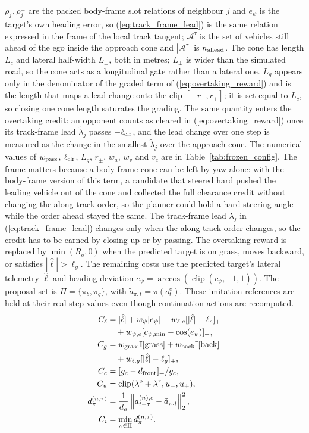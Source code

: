 \documentclass[journal]{IEEEtran}
\begin{document}
$\rho_j^{\parallel},\rho_j^{\perp}$ are the packed body-frame slot relations
of neighbour $j$ and $e_\psi$ is the target's own heading error, so
(\ref{eq:track_frame_lead}) is the same relation expressed in the frame of the
local track tangent; $\mathcal A^\tau$ is the set of vehicles still ahead of the
ego inside the approach cone and $|\mathcal A^\tau|$ is $n_{\rm ahead}$.
The cone has length $L_c$ and lateral half-width $L_\perp$, both in metres;
$L_\perp$ is wider than the simulated road, so the cone acts as a longitudinal
gate rather than a lateral one. $L_g$ appears only in the denominator of the
graded term of (\ref{eq:overtaking_reward}) and is the length that maps a lead
change onto the clip $[-r_-,r_+]$; it is set equal to $L_c$, so closing one cone
length saturates the grading.
The same quantity enters the overtaking credit: an opponent counts as cleared
in (\ref{eq:overtaking_reward}) once its track-frame lead $\tilde\lambda_j$
passes $-\ell_{\rm clr}$, and the lead change over one step is measured as the
change in the smallest $\tilde\lambda_j$ over the approach cone. The numerical
values of $w_{\rm pass}$, $\ell_{\rm clr}$, $L_g$, $r_\pm$, $w_a$, $w_v$ and
$v_c$ are in Table~\ref{tab:frozen_config}.
The frame matters because a body-frame cone can be left by yaw alone: with the
body-frame version of this term, a candidate that steered hard pushed the
leading vehicle out of the cone and collected the full clearance credit without
changing the along-track order, so the planner could hold a hard steering
angle while the order ahead stayed the same. The
track-frame lead $\tilde\lambda_j$ in (\ref{eq:track_frame_lead}) changes only
when the along-track order changes, so the credit has to be earned by closing
up or by passing. The overtaking reward is replaced by $\min(R_o,0)$ when the
predicted target is on grass, moves backward, or satisfies
$|\hat\ell|>\ell_g$.
The remaining costs use the predicted target's lateral telemetry $\hat\ell$
and heading deviation $e_\psi=\arccos(\operatorname{clip}(c_\psi,-1,1))$.
The proposal set is $\Pi=\{\pi_b,\pi_q\}$, with
$\tilde a_{\pi,t}=\pi(\bar o_t^e)$. These imitation references are held at
their real-step values even though continuation actions are recomputed.
\begin{equation}
\begin{aligned}
 C_\ell&=|\hat\ell|+w_\psi|e_\psi|+w_{\ell,e}[|\hat\ell|-\ell_e]_+\\
 &\quad+w_{\psi,e}[c_{\psi,\min}-\cos(e_\psi)]_+,\\
 C_g&=w_{\rm grass}\mathbb I[\mathrm{grass}]+w_{\rm back}\mathbb I[\mathrm{back}]\\
 &\quad+w_{\ell,g}[|\hat\ell|-\ell_g]_+,\\
 C_c&=[g_c-d_{\mathrm{front}}]_+/g_c,\\
 C_u&=\operatorname{clip}(\lambda^o+\lambda^r,u_-,u_+),\\
 d_{\pi}^{(n,\tau)}&=\frac{1}{d_a}\left\lVert a_{t+\tau}^{(n),e}
 -\tilde a_{\pi,t}\right\rVert_2^2,\\
 C_i&=\min_{\pi\in\Pi}d_{\pi}^{(n,\tau)}.
 \end{aligned}
\label{eq:planner_costs}
\end{equation}
\end{document}
